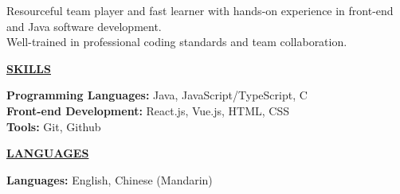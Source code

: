 \documentclass{article}
\begin{document}
\noindent Resourceful team player and fast learner with hands-on experience in front-end and Java software development. \\
Well-trained in professional coding standards and team collaboration.

\vspace{0.2cm}

\noindent \textbf{\underline{SKILLS}} \\
\vspace{-0.2cm}

\noindent \textbf{Programming Languages:} Java, JavaScript/TypeScript, C\\
\noindent \textbf{Front-end Development:} React.js, Vue.js, HTML, CSS\\
\noindent \textbf{Tools:} Git, Github\\

\vspace{0.2cm}

\noindent \textbf{\underline{LANGUAGES}} \\
\vspace{-0.2cm}

\noindent \textbf{Languages:} English, Chinese (Mandarin)
\end{document}
